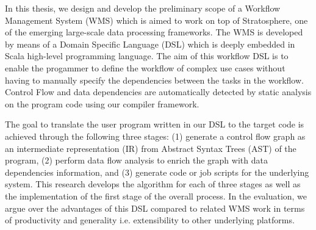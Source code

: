 % 
% 
%
In this thesis, we design and develop the preliminary scope of a Workflow Management System (WMS) which is aimed to work on top of Stratosphere, one of the emerging large-scale data processing frameworks. The WMS is developed by means of a Domain Specific Language (DSL) which is deeply embedded in Scala high-level programming language. The aim of this workflow DSL is to enable the progammer to define the workflow of complex use cases without having to manually specify the dependencies between the tasks in the workflow. Control Flow and data dependencies are automatically detected by static analysis on the program code using our compiler framework. 

The goal to translate the user program written in our DSL to the target code is achieved through the following three stages: (1) generate a control flow graph as an intermediate representation (IR) from Abstract Syntax Trees (AST) of the program, (2) perform data flow analysis to enrich the graph with data dependencies information, and (3) generate code or job scripts for the underlying system. This research develops the algorithm for each of three stages as well as the implementation of the first stage of the overall process. In the evaluation, we argue over the advantages of this DSL compared to related WMS work in terms of productivity and generality i.e. extensibility to other underlying platforms.
